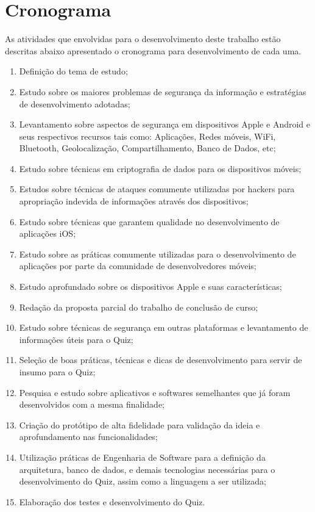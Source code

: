 \section{Cronograma}
As atividades que envolvidas para o desenvolvimento deste trabalho estão descritas abaixo apresentado o cronograma para desenvolvimento de cada uma.

\begin{enumerate}
    \item Definição do tema de estudo;
    \item  Estudo sobre os maiores problemas de segurança da informação e estratégias de desenvolvimento adotadas;
    \item Levantamento sobre aspectos de segurança em dispositivos Apple e Android e seus respectivos recursos tais como: Aplicações, Redes móveis, WiFi, Bluetooth, Geolocalização, Compartilhamento, Banco de Dados, etc;
    \item Estudo sobre técnicas em criptografia de dados para os dispositivos móveis;
    \item Estudos sobre técnicas de ataques comumente utilizadas por hackers para apropriação indevida de informações através dos dispositivos;
    \item Estudo sobre técnicas que garantem qualidade no desenvolvimento de aplicações iOS;
    \item  Estudo sobre as práticas comumente utilizadas para o desenvolvimento de aplicações por parte da comunidade de desenvolvedores móveis;
    \item Estudo aprofundado sobre os dispositivos Apple e suas características;
    \item  Redação da proposta parcial do trabalho de conclusão de curso;
    \item Estudo sobre técnicas de segurança em outras plataformas e levantamento de informações úteis para o Quiz;
    \item Seleção de boas práticas, técnicas e dicas de desenvolvimento para servir de insumo para o Quiz;
    \item Pesquisa e estudo sobre aplicativos e softwares semelhantes que já foram desenvolvidos com a mesma finalidade;
    \item Criação do protótipo de alta fidelidade para validação da ideia e aprofundamento nas funcionalidades;
    \item Utilização práticas de Engenharia de Software para a definição da arquitetura, banco de dados, e demais tecnologias necessárias para o desenvolvimento do Quiz, assim como a linguagem a ser utilizada;
    \item Elaboração dos testes e desenvolvimento do Quiz.

\end{enumerate}